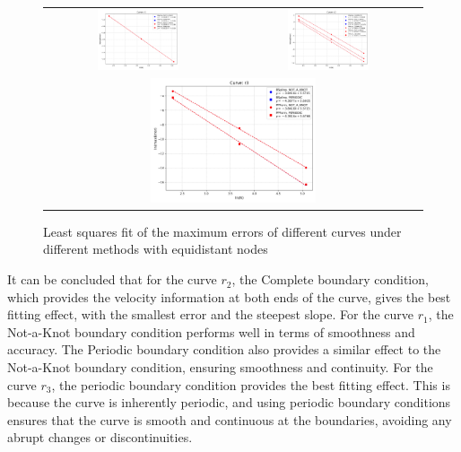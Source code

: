 \documentclass[a4paper]{article}
\begin{document}
\begin{sloppypar}
\begin{figure}[H]
  \centering
  \begin{tabular}{cc}
    \includegraphics[width=0.45\textwidth]{../figure/problemE/r1_lnMaxError_vs_lnN.png} &
    \includegraphics[width=0.45\textwidth]{../figure/problemE/r2_lnMaxError_vs_lnN.png}   \\
    \multicolumn{2}{c}{\includegraphics[width=0.45\textwidth]{../figure/problemE/r3_lnMaxError_vs_lnN.png}}
  \end{tabular}
  \renewcommand{\figurename}{Fig.}
  \caption{Least squares fit of the maximum errors of different curves under different methods with equidistant nodes}
  \label{fig:leastSquare_fit}
\end{figure}

It can be concluded that for the curve \(r_2\), the Complete boundary
condition, which provides the velocity information at both ends of the curve,
gives the best fitting effect, with the smallest error and the steepest slope.
For the curve \(r_1\), the Not-a-Knot boundary condition performs well in terms
of smoothness and accuracy. The Periodic boundary condition also provides a
similar effect to the Not-a-Knot boundary condition, ensuring smoothness and
continuity. For the curve \(r_3\), the periodic boundary condition provides the
best fitting effect. This is because the curve is inherently periodic, and
using periodic boundary conditions ensures that the curve is smooth and
continuous at the boundaries, avoiding any abrupt changes or discontinuities.


\end{sloppypar}
\end{document}
